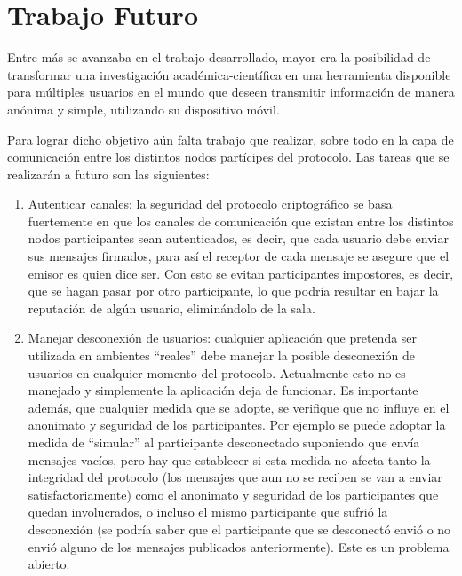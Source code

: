 \chapter{Trabajo Futuro}\label{cap6}

Entre más se avanzaba en el trabajo desarrollado, mayor era la posibilidad de 
transformar una investigación académica-científica en una herramienta 
disponible para múltiples usuarios en el mundo que deseen transmitir 
información de manera anónima y simple, utilizando su dispositivo móvil.

Para lograr dicho objetivo aún falta trabajo que realizar, sobre todo en la 
capa de comunicación entre los distintos nodos partícipes del protocolo. Las 
tareas que se realizarán a futuro son las siguientes:

\begin{enumerate}
    \item Autenticar canales: la seguridad del protocolo criptográfico se basa 
    fuertemente en que los canales de comunicación que existan entre los 
    distintos nodos participantes sean autenticados, es decir, que cada 
    usuario debe enviar sus mensajes firmados, para así el receptor de cada 
    mensaje se asegure que el emisor es quien dice ser. Con esto se evitan 
    participantes impostores, es decir, que se hagan pasar por otro 
    participante, lo que podría resultar en bajar la reputación de algún 
    usuario, eliminándolo de la sala.
    
    \item Manejar desconexión de usuarios: cualquier aplicación que pretenda 
    ser utilizada en ambientes ``reales'' debe manejar la posible desconexión 
    de usuarios en cualquier momento del protocolo. Actualmente esto no es 
    manejado y simplemente la aplicación deja de funcionar. Es importante 
    además, que cualquier medida que se adopte, se verifique que no influye en 
    el anonimato y seguridad de los participantes. Por ejemplo se puede 
    adoptar la medida de ``simular'' al participante desconectado suponiendo 
    que envía mensajes vacíos, pero hay que establecer si esta medida no 
    afecta tanto la integridad del protocolo (los mensajes que aun no se 
    reciben se van a enviar satisfactoriamente) como el anonimato y seguridad 
    de los participantes que quedan involucrados, o incluso el mismo 
    participante que sufrió la desconexión (se podría saber que el 
    participante que se desconectó envió o no envió alguno de los mensajes 
    publicados anteriormente). Este es un problema abierto.
    

\end{enumerate}
